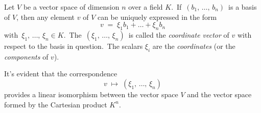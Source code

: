 \documentclass[12pt]{article}
\theoremstyle{definition}
\begin{document}
Let $V$ be a vector space of dimension $n$ over a field $K$.\, If\, $(b_1,\,\ldots,\,b_n)$\, is a basis of $V$, then any element $v$ of $V$ can be uniquely expressed in the form
$$v \;=\; \xi_1b_1\!+\ldots+\!\xi_nb_n$$
with\, $\xi_1,\,\ldots,\,\xi_n \in K$.\, The  \,$(\xi_1,\,\ldots,\,\xi_n)$\ is called the \emph{coordinate vector} of $v$ with respect to the basis in question.\, The scalars $\xi_i$ are the \emph{coordinates} (or the \emph{components} of $v$).

It's evident that the correspondence
$$v \;\mapsto\; (\xi_1,\,\ldots,\,\xi_n)$$
provides a linear isomorphism between the vector space $V$ and the vector space formed by the Cartesian product $K^n$.


\end{document}
